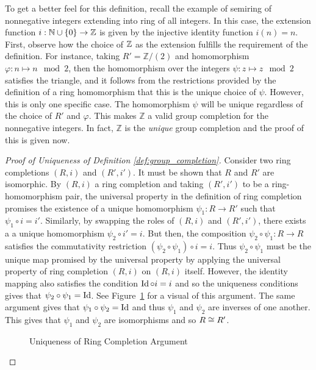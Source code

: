 \documentclass[../sean_thesis.tex]{subfiles}
\begin{document}
To get a better feel for this definition, recall the example of semiring of nonnegative integers extending into ring of all integers. In this case, the extension function $i: \mathbb{N} \cup \left\{0\right\} \to \mathbb{Z}$ is given by the injective identity function $i(n) = n$. First, observe how the choice of $\mathbb{Z}$ as the extension fulfills the requirement of the definition. For instance, taking $R' = \mathbb{Z}/(2)$ and homomorphism $\varphi: n \mapsto n\mod 2$, then the homomorphism over the integers $\psi: z \mapsto z\mod 2$ satisfies the triangle, and it follows from the restrictions provided by the definition of a ring homomorphism that this is the unique choice of $\psi$. However, this is only one specific case. The homomorphism $\psi$ will be unique regardless of the choice of $R'$ and $\varphi$. This makes $\mathbb{Z}$ a valid group completion for the nonnegative integers. In fact, $\mathbb{Z}$ is the \emph{unique} group completion and the proof of this is given now.

\begin{proof}[Proof of Uniqueness of Definition \ref{def:group_completion}]
Consider two ring completions $(R,i)$ and $(R',i')$. It must be shown that $R$ and $R'$ are isomorphic. By $(R,i)$ a ring completion and taking $(R',i')$ to be a ring-homomorphism pair,   the universal property in the definition of ring completion promises the existence of a unique homomorphism $\psi_1: R \to R'$ such that $\psi_1\circ i = i'$. Similarly, by swapping the roles of $(R,i)$ and $(R',i')$, there exists a a unique homomorphism $\psi_2\circ i' = i$. But then, the composition $\psi_2 \circ \psi_1: R \to R$ satisfies the commutativity restriction $(\psi_2 \circ \psi_1) \circ i = i$. Thus $\psi_2 \circ \psi_1$ must be the unique map promised by the universal property by applying the universal property of ring completion $(R,i)$ on $(R,i)$ itself. However, the identity mapping also satisfies the condition $\operatorname{Id} \circ i = i$ and so the uniqueness conditions gives that $\psi_2 \circ \psi_1 = \operatorname{Id}$. See Figure~\ref{fig:ring_comp_un} for a visual of this argument. The same argument gives that $\psi_1 \circ \psi_2 = \operatorname{Id}$ and thus $\psi_1$ and $\psi_2$ are inverses of one another. This gives that $\psi_1$ and $\psi_2$ are isomorphisms and so $R \cong R'$. 
 
\begin{figure}[ht!]
	
	\caption{Uniqueness of Ring Completion Argument}
	\label{fig:ring_comp_un}
\end{figure}

\end{proof}
\end{document}

